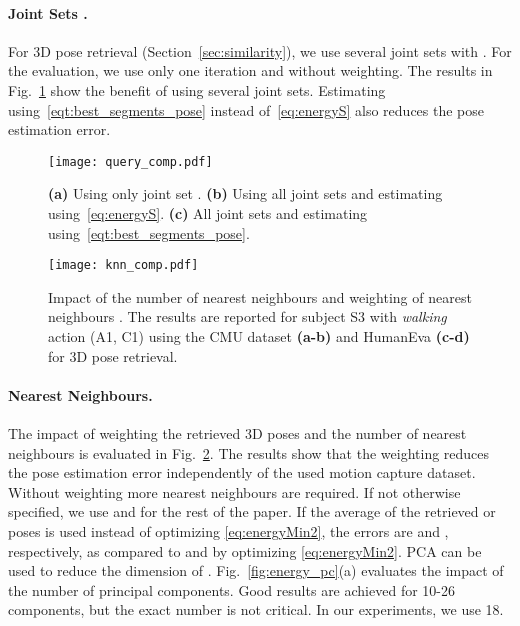 \documentclass[10pt,twocolumn,letterpaper]{article}
\newcommand{\fdps}{\mbox{}}
\begin{document}
\paragraph{Joint Sets .}
For 3D pose retrieval (Section~\ref{sec:similarity}), we use several joint sets  with . For the evaluation, we use only one iteration and  without weighting. The results in Fig.~\ref{fig:query} show the benefit of using several joint sets. Estimating  using~\eqref{eqt:best_segments_pose} instead of~\eqref{eq:energyS} also reduces the pose estimation error.
\begin{figure}[t]
\begin{center}

\texttt{[image: query\_comp.pdf]}
\end{center}
   \vspace{-2mm}	
   \caption{\textbf{(a)} Using only joint set \fdps. \textbf{(b)} Using all joint sets  and estimating  using~\eqref{eq:energyS}. \textbf{(c)} All joint sets  and estimating  using~\eqref{eqt:best_segments_pose}.}
\label{fig:query}
\end{figure}
\begin{figure}[t]
\begin{center}
\texttt{[image: knn\_comp.pdf]}
\end{center}
   \vspace{-2mm}	
   \caption{Impact of the number of nearest neighbours  and weighting of nearest neighbours . The results are reported for subject S3 with \textit{walking} action (A1, C1) using the CMU dataset \textbf{(a-b)} and HumanEva \textbf{(c-d)} for 3D pose retrieval.}
\label{fig:knn}
\end{figure}
\vspace{-3.5mm}
\paragraph{Nearest Neighbours.}
The impact of weighting the retrieved 3D poses and the number of nearest neighbours is evaluated in Fig.~\ref{fig:knn}. The results show that the weighting reduces the pose estimation error independently of the used motion capture dataset. Without weighting more nearest neighbours are required. If not otherwise specified, we use  and  for the rest of the paper. If the average of the retrieved  or  poses is used instead of optimizing \eqref{eq:energyMin2}, the errors are  and , respectively, as compared to  and  by optimizing \eqref{eq:energyMin2}.
PCA can be used to reduce the dimension of . Fig.~\ref{fig:energy_pc}(a) evaluates the impact of the number of principal components. Good results are achieved for 10-26 components, but the exact number is not critical.
In our experiments, we use 18.
\vspace{-3.5mm}
\end{document}
